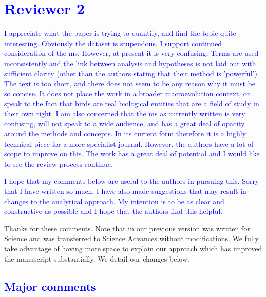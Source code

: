 \documentclass[12pt,letterpaper]{article}
\begin{document}
{\section*{\textcolor{blue}{Reviewer 2}}

\textcolor{blue}{I appreciate what the paper is trying to quantify, and find the topic quite interesting. Obviously the dataset is stupendous. I support continued consideration of the ms. However, at present it is very confusing. Terms are used inconsistently and the link between analysis and hypotheses is not laid out with sufficient clarity (other than the authors stating that their method is 'powerful'). The text is too short, and there does not seem to be any reason why it must be so concise. It does not place the work in a broader macroevolution context, or speak to the fact that birds are real biological entities that are a field of study in their own right. I am also concerned that the ms as currently written is very confusing, will not speak to a wide audience, and has a great deal of opacity around the methods and concepts. In its current form therefore it is a highly technical piece for a more specialist journal. However, the authors have a lot of scope to improve on this. The work has a great deal of potential and I would like to see the review process continue.}

\textcolor{blue}{I hope that my comments below are useful to the authors in pursuing this. Sorry that I have written so much. I have also made suggestions that may result in changes to the analytical approach. My intention is to be as clear and constructive as possible and I hope that the authors find this helpful.}

Thanks for these comments. Note that in our previous version was written for Science and was transferred to Science Advances without modifications. We fully take advantage of having more space to explain our approach which has improved the manuscript substantially. We detail our changes below.

\subsection*{\textcolor{blue}{Major comments}}

}
\end{document}
